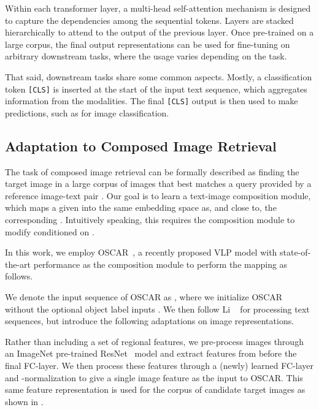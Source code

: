 \documentclass[10pt,twocolumn,letterpaper]{article}
\makeatletter
\renewcommand{\paragraph}{\@startsection{paragraph}{4}{\z@}{1.05ex \@plus 1ex \@minus .2ex}{-1em}{\normalfont\normalsize\bfseries}}
\makeatother
\begin{document}
Within each transformer layer, a multi-head self-attention mechanism is designed to capture the dependencies among the sequential tokens. Layers are stacked hierarchically to attend to the output of the previous layer. Once pre-trained on a large corpus, the final output representations can be used for fine-tuning on arbitrary downstream tasks, where the usage varies depending on the task.

That said, downstream tasks share some common aspects.
Mostly, a classification token \texttt{[CLS]} is inserted at the start of the input text sequence, which aggregates information from the modalities. The final \texttt{[CLS]} output is then used to make predictions, such as for image classification.

\subsection{Adaptation to Composed Image Retrieval}
The task of composed image retrieval can be formally described as finding the target image in a large corpus of images  that best matches a query provided by a reference image-text pair . 
Our goal is to learn a text-image composition module, which maps a given  into the same embedding space as, and close to, the corresponding . Intuitively speaking, this requires the composition module to modify  conditioned on .

In this work, we employ OSCAR~\cite{oscar}, a recently proposed VLP model with state-of-the-art performance as the composition module to perform the mapping as follows. 

\paragraph{Input sequence.}
We denote the input sequence of OSCAR as , where we initialize OSCAR without the optional object label inputs . We then follow Li \etal~\cite{oscar} for processing text sequences, but introduce the following adaptations on image representations.

Rather than including a set of regional features, we pre-process images through an ImageNet pre-trained ResNet~\cite{he2015deep} model and extract features from before the final FC-layer. We then process these features through a (newly) learned FC-layer and -normalization to give a single image feature  as the input to OSCAR. This same feature representation is used for the corpus of candidate target images  as shown in .
\end{document}

